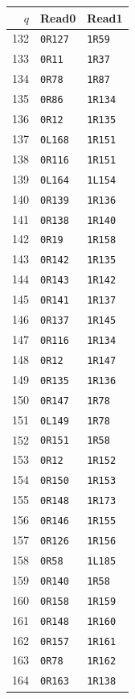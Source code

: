 \begin{center}
\begin{minipage}[t]{0.32\linewidth}
\begin{tabular}{rll}\toprule
$q$&Read0&Read1\\\midrule
132&\texttt{0R127}&\texttt{1R59}\\
133&\texttt{0R11}&\texttt{1R37}\\
134&\texttt{0R78}&\texttt{1R87}\\
135&\texttt{0R86}&\texttt{1R134}\\
136&\texttt{0R12}&\texttt{1R135}\\
137&\texttt{0L168}&\texttt{1R151}\\
138&\texttt{0R116}&\texttt{1R151}\\
139&\texttt{0L164}&\texttt{1L154}\\
140&\texttt{0R139}&\texttt{1R136}\\
141&\texttt{0R138}&\texttt{1R140}\\
142&\texttt{0R19}&\texttt{1R158}\\
143&\texttt{0R142}&\texttt{1R135}\\
144&\texttt{0R143}&\texttt{1R142}\\
145&\texttt{0R141}&\texttt{1R137}\\
146&\texttt{0R137}&\texttt{1R145}\\
147&\texttt{0R116}&\texttt{1R134}\\
148&\texttt{0R12}&\texttt{1R147}\\
149&\texttt{0R135}&\texttt{1R136}\\
150&\texttt{0R147}&\texttt{1R78}\\
151&\texttt{0L149}&\texttt{1R78}\\
152&\texttt{0R151}&\texttt{1R58}\\
153&\texttt{0R12}&\texttt{1R152}\\
154&\texttt{0R150}&\texttt{1R153}\\
155&\texttt{0R148}&\texttt{1R173}\\
156&\texttt{0R146}&\texttt{1R155}\\
157&\texttt{0R126}&\texttt{1R156}\\
158&\texttt{0R58}&\texttt{1L185}\\
159&\texttt{0R140}&\texttt{1R58}\\
160&\texttt{0R158}&\texttt{1R159}\\
161&\texttt{0R148}&\texttt{1R160}\\
162&\texttt{0R157}&\texttt{1R161}\\
163&\texttt{0R78}&\texttt{1R162}\\
164&\texttt{0R163}&\texttt{1R138}\\

\end{tabular}
\end{minipage}
\end{center}
